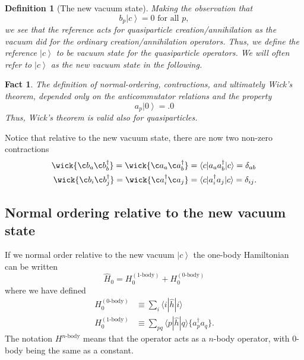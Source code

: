 \documentclass[a4paper,10pt]{article}
\newcommand{\braket}[1]{\langle#1\rangle}
\newcommand{\ket}[1]{\left| #1 \right\rangle} \newcommand{\element}[3]
\theoremstyle{definition}
\newtheorem{definition}{Definition}
\newtheorem{fact}{Fact}
\begin{document}
\begin{definition}[The new vacuum state]
Making the observation that 
\begin{equation}
 b_p \ket{c} = 0 \text{ for all } p,
\end{equation}
we see that the reference acts for quasiparticle creation/annihilation as the vacuum 
did for the ordinary creation/annihilation operators. Thus, we define the reference $\ket{c}$ to be
vacuum state for the quasiparticle operators. We will often refer to $\ket{c}$ as the new vacuum state in 
the following.
\end{definition}
\begin{fact}
The definition of normal-ordering, contractions, and ultimately Wick's
theorem, depended only on the anticommutator relations and the property $$a_p \ket{0} = .0$$ Thus, Wick's
theorem is valid also for quasiparticles.
\end{fact}

Notice that relative to the new vacuum state, there are now two non-zero contractions
\begin{align} 
 \wick{\c b_a \c b_b^\dagger} = \wick{\c a_a \c a_b^\dagger} &= \braket{c|a_a a_b^\dagger|c} = \delta_{ab} \\
 \wick{\c b_i \c b_j^\dagger} = \wick{\c a_i^\dagger \c a_j} &= \braket{c|a_i^\dagger a_j|c} = \delta_{ij}. \\
\end{align}

\subsection{Normal ordering relative to the new vacuum state}
If we normal order relative to the new vacuum $\ket{c}$ the one-body Hamiltonian can be written 
\begin{equation}
 \hat{H}_0 = H_0^{(1\text{-body})} + H_0^{(0\text{-body})} 
\end{equation}
where we have defined 
\begin{align}
 H_0^{(0\text{-body})} &\equiv \sum_i \braket{i|\hat{h}|i} \\
 H_0^{(1\text{-body})} &\equiv \sum_{pq} \braket{p|\hat{h}|q} \{a_p^\dagger a_q \}.
\end{align}
The notation $H^{n\text{-body}}$ means that the operator acts as a $n$-body operator, with $0$-body being the same 
as a constant.
\end{document}
